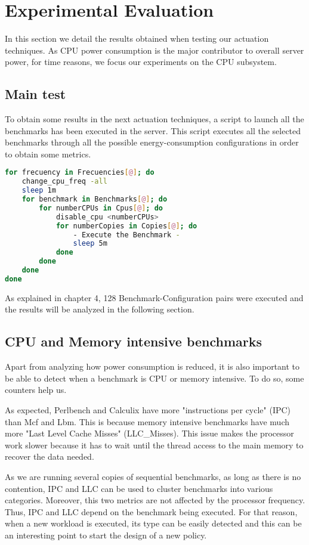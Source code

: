 \section{Experimental Evaluation}

In this section we detail the results obtained when testing our actuation techniques. As CPU power consumption is the major contributor to overall server power, for time reasons, we focus our experiments on the CPU subsystem.
\subsection{Main test}

To obtain some results in the next actuation techniques, a script to launch all the benchmarks has been executed in the server. This script executes all the selected benchmarks through all the possible energy-consumption configurations in order to obtain some metrics.

\begin{lstlisting}[language=Bash]
for frecuency in Frecuencies[@]; do
    change_cpu_freq -all
    sleep 1m
    for benchmark in Benchmarks[@]; do
        for numberCPUs in Cpus[@]; do
            disable_cpu <numberCPUs>
            for numberCopies in Copies[@]; do
                - Execute the Benchmark -
                sleep 5m
            done
        done
    done
done
\end{lstlisting}

As explained in chapter 4, 128 Benchmark-Configuration pairs were executed and the results will be analyzed in the following section.

\subsection{CPU and Memory intensive benchmarks}

Apart from analyzing how power consumption is reduced, it is also important to be able to detect when a benchmark is CPU or memory intensive. To do so, some counters help us.

As expected, Perlbench and Calculix have more "instructions per cycle" (IPC) than Mcf and Lbm. This is because memory intensive benchmarks have much more "Last Level Cache Misses" (LLC\_Misses). This issue makes the processor work slower because it has to wait until the thread access to the main memory to recover the data needed.

As we are running several copies of sequential benchmarks, as long as there is no contention, IPC and LLC can be used to cluster benchmarks into various categories. Moreover, this two metrics are not affected by the processor frequency. Thus, IPC and LLC depend on the benchmark being executed. For that reason, when a new workload is executed, its type can be easily detected and this can be an interesting point to start the design of a new policy.

